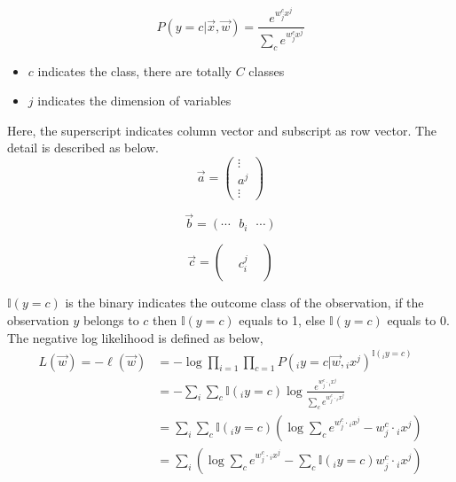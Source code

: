 \documentclass[12pt,a4paper]{article}%
\theoremstyle{definition}
\theoremstyle{plain}
\numberwithin{equation}{section}
\begin{document}
\begin{equation*}
P(y = c| \vec{x} ,\vec{w}) = \frac{e^{w^{c}_{j} x^{j}}} { \sum\limits_{c} e^{ w^{c}_{j} x^{j} } }
\end{equation*}

\begin{itemize}
\item $c$ indicates the class, there are totally $C$ classes
\item $j$ indicates the dimension of variables	
\end{itemize}

Here, the superscript indicates column vector and subscript as row vector. The detail is described as below.
\begin{equation}
\vec{a} = \begin{pmatrix}
 \vdots \\
  a^{j}  \\
 \vdots
\end{pmatrix}
\end{equation} 

\begin{equation}
\vec{b} =  ( \cdots ~~~ b_{i} ~~~\cdots )  
\end{equation} 
				
\begin{equation}
\vec{c} = \begin{pmatrix}
  &  &  \\
 &  c_{i}^{j} &   \\
 &   &
\end{pmatrix}
\end{equation} 

$\mathbb{I}(y=c)$ is the binary indicates the outcome class of the observation, if the observation $y$ belongs to $c$ then $\mathbb{I}(y=c)$ equals to 1, else $\mathbb{I}(y=c)$ equals to 0.
The negative log likelihood is defined as below, 
\begin{align*}
L(\vec{w}) = -\ell(\vec{w}) &= - \log \prod\limits_{i=1} \prod\limits_{c=1}  P( {}_iy = c | \vec{w}, {}_ix^{j} )^{\mathbb{I}({}_iy = c)} \\
										  &= - \sum\limits_{i} \sum\limits_{c}  \mathbb{I}({}_iy = c) \log \frac{e^{ w^{c}_{j} \cdot {}_ix^{j} }} { \sum\limits_{c} e^{ w^{c}_{j} \cdot {}_ix^{j} } } \\
										  &= \sum\limits_{i} \sum\limits_{c} \mathbb{I}({}_iy = c) ( \log \sum\limits_{c} e^{ w^{c}_{j} \cdot {}_ix^{j} } - w^{c}_{j} \cdot {}_ix^{j}  ) \\
										  &= \sum\limits_{i} ( \log \sum\limits_{c} e^{ w^{c}_{j} \cdot {}_ix^{j} } - \sum\limits_{c} \mathbb{I}({}_iy = c)  w^{c}_{j} \cdot {}_ix^{j}  )
\end{align*}
\end{document}
